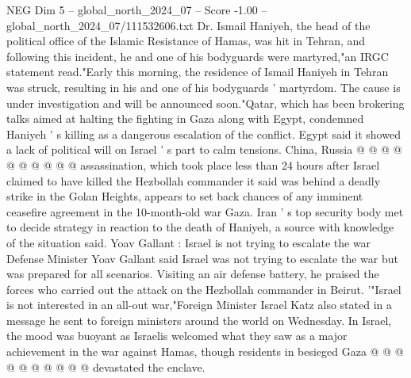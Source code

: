 \begin{textsample}{NEG Dim 5 – global\_north\_2024\_07 – Score -1.00 – global\_north\_2024\_07/111532606.txt}
Dr.
Ismail Haniyeh, the head of the political office of the Islamic Resistance of Hamas, was hit in Tehran, and following this incident, he and one of his bodyguards were martyred,"an IRGC statement read."Early this morning, the residence of Ismail Haniyeh in Tehran was struck, resulting in his and one of his bodyguards ' martyrdom.
The cause is under investigation and will be announced soon."Qatar, which has been brokering talks aimed at halting the fighting in Gaza along with Egypt, condemned Haniyeh ' s killing as a dangerous escalation of the conflict.
Egypt said it showed a lack of political will on Israel ' s part to calm tensions.
China, Russia @ @ @ @ @ @ @ @ @ @ assassination, which took place less than 24 hours after Israel claimed to have killed the Hezbollah commander it said was behind a deadly strike in the Golan Heights, appears to set back chances of any imminent ceasefire agreement in the 10-month-old war Gaza.
Iran ' s top security body met to decide strategy in reaction to the death of Haniyeh, a source with knowledge of the situation said.
Yoav Gallant : Israel is not trying to escalate the war Defense Minister Yoav Gallant said Israel was not trying to escalate the war but was prepared for all scenarios.
Visiting an air defense battery, he praised the forces who carried out the attack on the Hezbollah commander in Beirut. '"Israel is not interested in an all-out war,"Foreign Minister Israel Katz also stated in a message he sent to foreign ministers around the world on Wednesday.
In Israel, the mood was buoyant as Israelis welcomed what they saw as a major achievement in the war against Hamas, though residents in besieged Gaza @ @ @ @ @ @ @ @ @ @ devastated the enclave.

\end{textsample}
